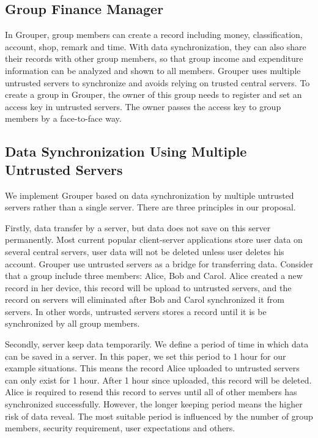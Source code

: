 \documentclass[twocolumn,10pt]{article}
\begin{document}
\subsection{Group Finance Manager}
 In Grouper, group members can create a record including money, classification, account, shop, remark and time. With data synchronization, they can also share their records with other group members, so that group income and expenditure information can be analyzed and shown to all members. Grouper uses multiple untrusted servers to synchronize and avoids relying on trusted central servers. To create a group in Grouper, the owner of this group needs to register and set an access key in untrusted servers. The owner  passes the access key to group members by a face-to-face way.

\subsection{Data Synchronization Using Multiple Untrusted Servers}

We implement Grouper based on data synchronization by multiple untrusted servers rather than a single server. There are three principles in our proposal. 

Firstly, data transfer by a server, but data does not save on this server permanently. Most current popular client-server applications store user data on several central servers, user data will not be deleted unless user deletes his account. Grouper use untrusted servers as a bridge for transferring data. Consider that a group include three members: Alice, Bob and Carol. Alice created a new record in her device, this record will be upload to untrusted servers, and the record on servers will eliminated after Bob and Carol synchronized it from servers. In other words, untrusted servers stores a record until it is be synchronized by all group members.

Secondly, server keep data temporarily. We define a period of time in which data can be saved in a server. In this paper, we set this period to 1 hour for our example situations. This means the record Alice uploaded to untrusted servers can only exist for 1 hour. After 1 hour since uploaded, this record will be deleted. Alice is required to resend this record to serves until all of other members has synchronized successfully. However, the longer keeping period means the higher risk of data reveal. The most suitable period is influenced by the number of group members, security requirement, user expectations and others. 
\end{document}
